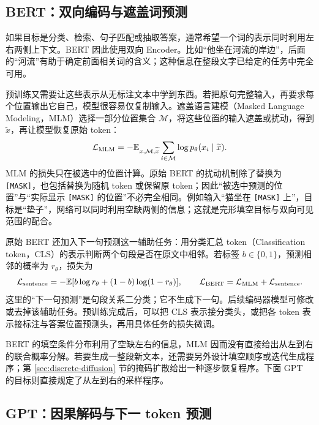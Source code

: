 \subsection{BERT：双向编码与遮盖词预测}
\label{sec:bert-mlm-link}

如果目标是分类、检索、句子匹配或抽取答案，通常希望一个词的表示同时利用左右两侧上下文。BERT 因此使用双向 Encoder。比如“他坐在河流的岸边”，后面的“河流”有助于确定前面相关词的含义；这种信息在整段文字已给定的任务中完全可用。

预训练又需要让这些表示从无标注文本中学到东西。若把原句完整输入，再要求每个位置输出它自己，模型很容易仅复制输入。遮盖语言建模（Masked Language Modeling，MLM）选择一部分位置集合 \(\mathcal M\)，将这些位置的输入遮盖或扰动，得到 \(\widetilde x\)，再让模型恢复原始 token：
\begin{equation}
 \mathcal L_{\mathrm{MLM}}
 =-\mathbb{E}_{x,\mathcal M,\widetilde x}\sum_{i\in\mathcal M}
 \log p_\theta(x_i\mid\widetilde x).
 \label{eq:bert-mlm}
\end{equation}
MLM 的损失只在被选中的位置计算。原始 BERT 的扰动机制除了替换为 \texttt{[MASK]}，也包括替换为随机 token 或保留原 token；因此“被选中预测的位置”与“实际显示 \texttt{[MASK]} 的位置”不必完全相同。例如输入“猫坐在 \texttt{[MASK]} 上”，目标是“垫子”，网络可以同时利用空缺两侧的信息；这就是完形填空目标与双向可见范围的配合。

原始 BERT 还加入下一句预测这一辅助任务：用分类汇总 token（Classification token，CLS）的表示判断两个句段是否在原文中相邻。若标签 \(b\in\{0,1\}\)，预测相邻的概率为 \(r_\theta\)，损失为
\begin{equation}
 \mathcal L_{\mathrm{sentence}}=-\mathbb{E}[b\log r_\theta+(1-b)\log(1-r_\theta)],\qquad
 \mathcal L_{\mathrm{BERT}}=\mathcal L_{\mathrm{MLM}}+\mathcal L_{\mathrm{sentence}}.
\end{equation}
这里的“下一句预测”是句段关系二分类；它不生成下一句。后续编码器模型可修改或去掉该辅助任务。预训练完成后，可以把 CLS 表示接分类头，或把各 token 表示接标注与答案位置预测头，再用具体任务的损失微调。

BERT 的填空条件分布利用了空缺左右的信息，MLM 因而没有直接给出从左到右的联合概率分解。若要生成一整段新文本，还需要另外设计填空顺序或迭代生成程序；第 \ref{sec:discrete-diffusion} 节的掩码扩散给出一种逐步恢复程序。下面 GPT 的目标则直接规定了从左到右的采样程序。

\subsection{GPT：因果解码与下一 token 预测}

